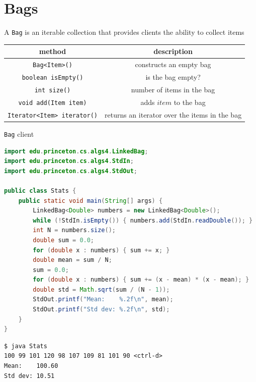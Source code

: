 \documentclass[8pt,a4paper,compress]{beamer}
\begin{document}
\section{Bags}
\begin{frame}[fragile]
\pause

A \lstinline{Bag} is an iterable collection that provides clients the ability to collect items
\begin{center}
\begin{tabular}{cc}
method & description \\ \hline
\lstinline$Bag<Item>()$ & constructs an empty bag \\
\lstinline$boolean isEmpty()$ & is the bag empty? \\
\lstinline$int size()$ & number of items in the bag \\
\lstinline$void add(Item item)$ & adds $item$ to the bag \\
\lstinline$Iterator<Item> iterator()$ & returns an iterator over the items in the bag
\end{tabular} 
\end{center}

\pause

\lstinline{Bag} client
\begin{lstlisting}[language=Java]
import edu.princeton.cs.algs4.LinkedBag;
import edu.princeton.cs.algs4.StdIn;
import edu.princeton.cs.algs4.StdOut;

public class Stats {
    public static void main(String[] args) {
        LinkedBag<Double> numbers = new LinkedBag<Double>();
        while (!StdIn.isEmpty()) { numbers.add(StdIn.readDouble()); }
        int N = numbers.size();
        double sum = 0.0;
        for (double x : numbers) { sum += x; }
        double mean = sum / N;
        sum = 0.0;
        for (double x : numbers) { sum += (x - mean) * (x - mean); }
        double std = Math.sqrt(sum / (N - 1));
        StdOut.printf("Mean:    %.2f\n", mean);
        StdOut.printf("Std dev: %.2f\n", std);
    }
}
\end{lstlisting}

\pause

\begin{lstlisting}[language={}]
$ java Stats
100 99 101 120 98 107 109 81 101 90 <ctrl-d>
Mean:    100.60
Std dev: 10.51
\end{lstlisting}
\end{frame}
\end{document}
